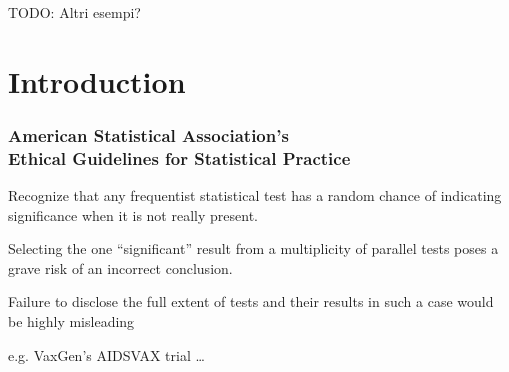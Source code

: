 \documentclass[xcolor={pdftex,dvipsnames,table}]{beamer}
\begin{document}
\begin{frame}
    TODO:
    Altri esempi?
\end{frame}

\section{Introduction}

\begin{frame}
\frametitle{American Statistical Association's\\
Ethical Guidelines for Statistical Practice}

Recognize that any frequentist %
statistical test has a random %
chance of indicating significance %
when it is not really present. %
\bigskip

Selecting the one ``significant'' %
result from a multiplicity of parallel  %
tests poses a grave risk of an  %
incorrect conclusion.   %
\bigskip

Failure to disclose the full extent %
of tests and their results in such  %
a case would be highly misleading %
\pause

\bigskip
e.g. VaxGen's AIDSVAX trial \ldots
\end{frame}
\end{document}
